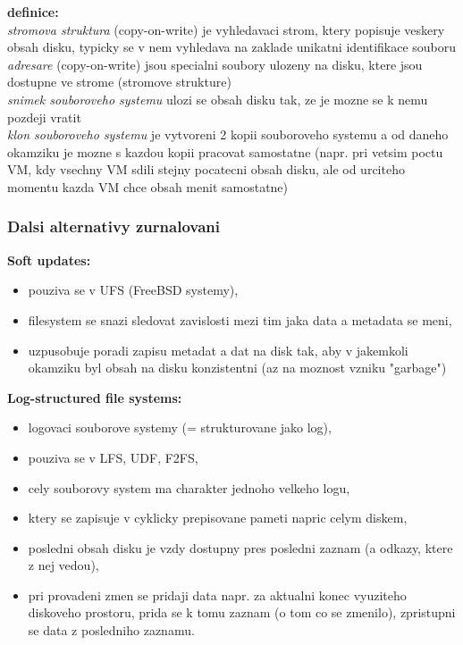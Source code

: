 \documentclass[a4paper, 11pt]{article}
\begin{document}
\textbf{definice:} \\[0.5em]
\textit{stromova struktura} (copy-on-write) je vyhledavaci strom, ktery popisuje veskery obsah disku, typicky se v nem vyhledava na zaklade unikatni identifikace souboru \\[0.2em]
\textit{adresare} (copy-on-write) jsou specialni soubory ulozeny na disku, ktere jsou dostupne ve strome (stromove strukture) \\[0.2em]
\textit{snimek souboroveho systemu} ulozi se obsah disku tak, ze je mozne se k nemu pozdeji vratit \\[0.2em]
\textit{klon souboroveho systemu} je vytvoreni 2 kopii souboroveho systemu a od daneho okamziku je mozne s kazdou kopii pracovat samostatne (napr. pri vetsim poctu VM, kdy vsechny VM sdili stejny pocatecni obsah disku, ale od urciteho momentu kazda VM chce obsah menit samostatne) \\

\newpage

\subsubsection{Dalsi alternativy zurnalovani}
\textbf{Soft updates:}
\begin{itemize}
    \item pouziva se v UFS (FreeBSD systemy),
    \item filesystem se snazi sledovat zavislosti mezi tim jaka data a metadata se meni,
    \item uzpusobuje poradi zapisu metadat a dat na disk tak, aby v jakemkoli okamziku byl obsah na disku konzistentni (az na moznost vzniku "garbage") \\
\end{itemize}

\textbf{Log-structured file systems:}
\begin{itemize}
    \item logovaci souborove systemy (= strukturovane jako log),
    \item pouziva se v LFS, UDF, F2FS,
    \item cely souborovy system ma charakter jednoho velkeho logu,
    \item ktery se zapisuje v cyklicky prepisovane pameti napric celym diskem,
    \item posledni obsah disku je vzdy dostupny pres posledni zaznam (a odkazy, ktere z nej vedou),
    \item pri provadeni zmen se pridaji data napr. za aktualni konec vyuziteho diskoveho prostoru, prida se k tomu zaznam (o tom co se zmenilo), zpristupni se data z posledniho zaznamu. \\
\end{itemize}
\end{document}
